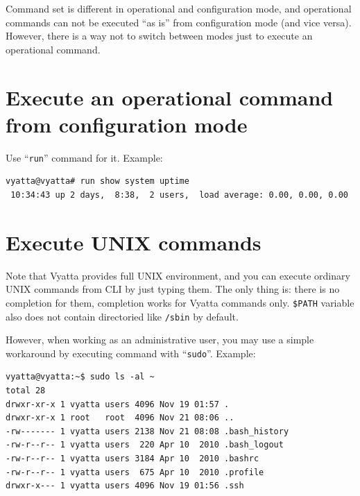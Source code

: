 Command set is different in operational and configuration mode, and operational commands can not be executed
``as is'' from configuration mode (and vice versa). However, there is a way not to switch between modes just to
execute an operational command.

\section{Execute an operational command from configuration mode}
Use ``\texttt{run}'' command for it. Example:
\begin{verbatim}
vyatta@vyatta# run show system uptime 
 10:34:43 up 2 days,  8:38,  2 users,  load average: 0.00, 0.00, 0.00
\end{verbatim}


\section{Execute UNIX commands}
Note that Vyatta provides full UNIX environment, and you can execute ordinary UNIX commands from CLI by just typing
them. The only thing is: there is no completion for them, completion works for Vyatta commands only. 
\texttt{\$PATH} variable also does not contain directoried like \texttt{/sbin} by default.

However, when working as an administrative user, you may use a simple workaround by executing command with
``\texttt{sudo}''. Example:
\begin{verbatim}
vyatta@vyatta:~$ sudo ls -al ~
total 28
drwxr-xr-x 1 vyatta users 4096 Nov 19 01:57 .
drwxr-xr-x 1 root   root  4096 Nov 21 08:06 ..
-rw------- 1 vyatta users 2138 Nov 21 08:08 .bash_history
-rw-r--r-- 1 vyatta users  220 Apr 10  2010 .bash_logout
-rw-r--r-- 1 vyatta users 3184 Apr 10  2010 .bashrc
-rw-r--r-- 1 vyatta users  675 Apr 10  2010 .profile
drwxr-x--- 1 vyatta users 4096 Nov 19 01:56 .ssh
\end{verbatim}
